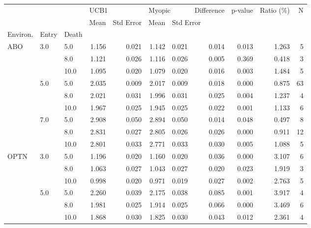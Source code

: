 \begin{tabular}{lllrrrrrrrr}
\toprule
    &     &      & \multicolumn{2}{l}{UCB1} & \multicolumn{2}{l}{Myopic} & Difference & p-value & Ratio (\%) &   N \\
    &     &      &  Mean & Std Error &   Mean & \multicolumn{5}{l}{Std Error} \\
Environ. & Entry & Death &       &           &        &           &            &         &           &     \\
\midrule
ABO & 3.0 & 5.0  & 1.156 &     0.021 &  1.142 &     0.021 &      0.014 &   0.013 &     1.263 &   5 \\
    &     & 8.0  & 1.121 &     0.026 &  1.116 &     0.026 &      0.005 &   0.369 &     0.418 &   3 \\
    &     & 10.0 & 1.095 &     0.020 &  1.079 &     0.020 &      0.016 &   0.003 &     1.484 &   5 \\
    & 5.0 & 5.0  & 2.035 &     0.009 &  2.017 &     0.009 &      0.018 &   0.000 &     0.875 &  63 \\
    &     & 8.0  & 2.021 &     0.031 &  1.996 &     0.031 &      0.025 &   0.004 &     1.237 &   4 \\
    &     & 10.0 & 1.967 &     0.025 &  1.945 &     0.025 &      0.022 &   0.001 &     1.133 &   6 \\
    & 7.0 & 5.0  & 2.908 &     0.050 &  2.894 &     0.050 &      0.014 &   0.048 &     0.497 &   8 \\
    &     & 8.0  & 2.831 &     0.027 &  2.805 &     0.026 &      0.026 &   0.000 &     0.911 &  12 \\
    &     & 10.0 & 2.801 &     0.033 &  2.771 &     0.033 &      0.030 &   0.005 &     1.088 &   5 \\
OPTN & 3.0 & 5.0  & 1.196 &     0.020 &  1.160 &     0.020 &      0.036 &   0.000 &     3.107 &   6 \\
    &     & 8.0  & 1.063 &     0.027 &  1.043 &     0.027 &      0.020 &   0.023 &     1.919 &   3 \\
    &     & 10.0 & 0.998 &     0.020 &  0.971 &     0.019 &      0.027 &   0.002 &     2.763 &   5 \\
    & 5.0 & 5.0  & 2.260 &     0.039 &  2.175 &     0.038 &      0.085 &   0.001 &     3.917 &   4 \\
    &     & 8.0  & 1.981 &     0.025 &  1.914 &     0.025 &      0.066 &   0.000 &     3.469 &   6 \\
    &     & 10.0 & 1.868 &     0.030 &  1.825 &     0.030 &      0.043 &   0.012 &     2.361 &   4 \\

\end{tabular}
